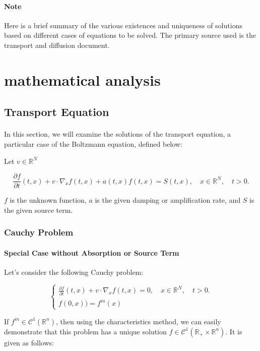 \documentclass[a4paper, 11pt]{article}
\begin{document}
\paragraph{Note} Here is a brief summary of the various existences and uniqueness of solutions based on different cases of equations to be solved. The primary source used is the transport and diffusion document.
\section{mathematical analysis}

\subsection{Transport Equation}

\paragraph{}
In this section, we will examine the solutions of the transport equation, a particular case of the Boltzmann equation, defined below:



Let $v \in \mathbb{R}^N$

\begin{equation} \label{transport}
	\frac{\partial f}{\partial t}(t,x)+v \cdot \nabla_x f(t,x) + a(t,x)f(t,x) = S(t,x), \quad x \in \mathbb{R}^N, \quad t>0.
\end{equation}


$f$ is the unknown function, $a$ is the given damping or amplification rate, and $S$ is the given source term.

\subsubsection{Cauchy Problem}
\paragraph{Special Case without Absorption or Source Term}

Let's consider the following Cauchy problem:

\[
\begin{cases}
	\frac{\partial f}{\partial t}(t,x)+v \cdot \nabla_x f(t,x)=0, \quad x \in \mathbb{R}^N, \quad t>0.\\
	f(0,x)) = f^{in}(x)
\end{cases}
\]

If $f^{in} \in \mathcal{C}^1(\mathbb{R}^n)$, then using the characteristics method, we can easily demonstrate that this problem has a unique solution $f \in \mathcal{C}^1(\mathbb{R}_+ \times \mathbb{R}^n)$. It is given as follows:
\end{document}
